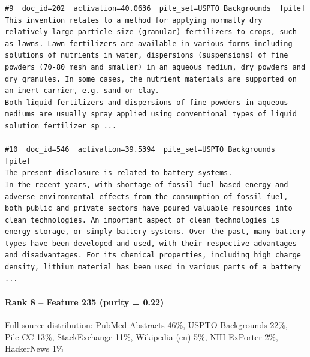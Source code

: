\begin{verbatim}
#9  doc_id=202  activation=40.0636  pile_set=USPTO Backgrounds  [pile]
This invention relates to a method for applying normally dry relatively large particle size (granular) fertilizers to crops, such as lawns. Lawn fertilizers are available in various forms including solutions of nutrients in water, dispersions (suspensions) of fine powders (70-80 mesh and smaller) in an aqueous medium, dry powders and dry granules. In some cases, the nutrient materials are supported on an inert carrier, e.g. sand or clay.
Both liquid fertilizers and dispersions of fine powders in aqueous mediums are usually spray applied using conventional types of liquid solution fertilizer sp ...

#10  doc_id=546  activation=39.5394  pile_set=USPTO Backgrounds  [pile]
The present disclosure is related to battery systems.
In the recent years, with shortage of fossil-fuel based energy and adverse environmental effects from the consumption of fossil fuel, both public and private sectors have poured valuable resources into clean technologies. An important aspect of clean technologies is energy storage, or simply battery systems. Over the past, many battery types have been developed and used, with their respective advantages and disadvantages. For its chemical properties, including high charge density, lithium material has been used in various parts of a battery ...

\end{verbatim}

\paragraph*{Rank 8 -- Feature 235 (purity = 0.22)}

Full source distribution: PubMed Abstracts 46\%, USPTO Backgrounds 22\%, Pile-CC 13\%, StackExchange 11\%, Wikipedia (en) 5\%, NIH ExPorter 2\%, HackerNews 1\%

